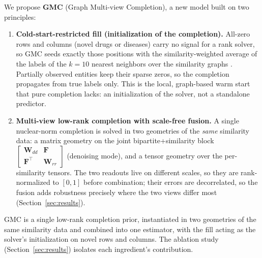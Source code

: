 \documentclass[webpdf,modern,large]{oup-authoring-template}
\begin{document}
We propose \textbf{GMC} (Graph Multi-view Completion), a new model built on two principles:

\begin{enumerate}
    \item \textbf{Cold-start-restricted fill (initialization of the completion).} All-zero rows and columns (novel drugs or diseases) carry no signal for a rank solver, so GMC seeds exactly those positions with the similarity-weighted average of the labels of the $k=10$ nearest neighbors over the similarity graphs \citep{yang2019omc2}. Partially observed entities keep their sparse zeros, so the completion propagates from true labels only. This is the local, graph-based warm start that pure completion lacks: an initialization of the solver, not a standalone predictor.

    \item \textbf{Multi-view low-rank completion with scale-free fusion.} A single nuclear-norm completion is solved in two geometries of the \emph{same} similarity data: a matrix geometry on the joint bipartite+similarity block $\left[\begin{smallmatrix}\mathbf{W}_{dd} & \mathbf{F}\\ \mathbf{F}^\top & \mathbf{W}_{rr}\end{smallmatrix}\right]$ (denoising mode), and a tensor geometry over the per-similarity tensors. The two readouts live on different scales, so they are rank-normalized to $[0,1]$ before combination; their errors are decorrelated, so the fusion adds robustness precisely where the two views differ most (Section~\ref{sec:results}).
\end{enumerate}

GMC is a single low-rank completion prior, instantiated in two geometries of the same similarity data and combined into one estimator, with the fill acting as the solver's initialization on novel rows and columns. The ablation study (Section~\ref{sec:results}) isolates each ingredient's contribution.
\end{document}
